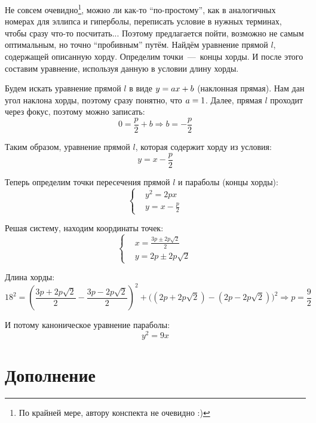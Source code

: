 \documentclass[a4paper,12pt]{article}
\begin{document}
  \begin{solution}
    Не совсем очевидно\footnote{По крайней мере, автору конспекта не очевидно :)}, можно ли как-то ``по-простому'', как в аналогичных номерах для эллипса и гиперболы, переписать условие в нужных терминах, чтобы сразу что-то посчитать...
    Поэтому предлагается пойти, возможно не самым оптимальным, но точно ``пробивным'' путём.
    Найдём уравнение прямой $l$, содержащей описанную хорду.
    Определим точки~---~концы хорды.
    И после этого составим уравнение, используя данную в условии длину хорды.
    
    Будем искать уравнение прямой $l$ в виде $y \hm= ax \hm+ b$ (наклонная прямая).
    Нам дан угол наклона хорды, поэтому сразу понятно, что $a \hm= 1$.
    Далее, прямая $l$ проходит через фокус, поэтому можно записать:
    \[
      0 = \frac{p}{2} + b \Rightarrow b = -\frac{p}{2}
    \]
    
    Таким образом, уравнение прямой $l$, которая содержит хорду из условия:
    \[
      y = x - \frac{p}{2}
    \]
    
    Теперь определим точки пересечения прямой $l$ и параболы (концы хорды):
    \[
      \left\{
        \begin{aligned}
          &y^2 = 2px\\
          &y = x - \frac{p}{2}
        \end{aligned}
      \right.
    \]
    
    Решая систему, находим координаты точек:
    \[
      \left\{
        \begin{aligned}
          &x = \frac{3p \pm 2p\sqrt{2}}{2}\\
          &y = 2p \pm 2p\sqrt{2}
        \end{aligned}
      \right.
    \]
    
    Длина хорды:
    \[
      18^2 = \left(\frac{3p + 2p\sqrt{2}}{2} - \frac{3p - 2p\sqrt{2}}{2}\right)^2
             + \Biggl(\left(2p + 2p\sqrt{2}\right) - \left(2p - 2p\sqrt{2}\right)\Biggr)^2
           \Rightarrow p = \frac{9}{2}
    \]
    
    И потому каноническое уравнение параболы:
    \[
      y^2 = 9x
    \]
  \end{solution}
  
  
  \newpage
  
  
  \section{Дополнение}
  
\end{document}
